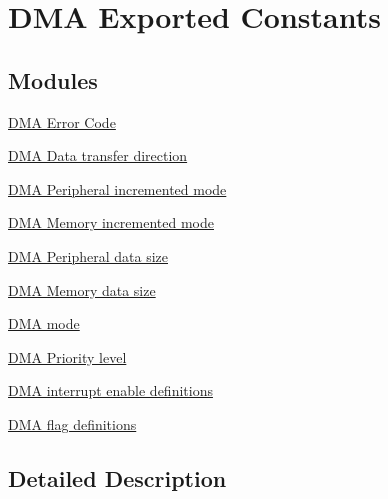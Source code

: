 \hypertarget{group___d_m_a___exported___constants}{}\section{D\+MA Exported Constants}
\label{group___d_m_a___exported___constants}
\subsection*{Modules}
\begin{DoxyCompactItemize}
\item 
\hyperlink{group___d_m_a___error___code}{D\+M\+A Error Code}
\item 
\hyperlink{group___d_m_a___data__transfer__direction}{D\+M\+A Data transfer direction}
\item 
\hyperlink{group___d_m_a___peripheral__incremented__mode}{D\+M\+A Peripheral incremented mode}
\item 
\hyperlink{group___d_m_a___memory__incremented__mode}{D\+M\+A Memory incremented mode}
\item 
\hyperlink{group___d_m_a___peripheral__data__size}{D\+M\+A Peripheral data size}
\item 
\hyperlink{group___d_m_a___memory__data__size}{D\+M\+A Memory data size}
\item 
\hyperlink{group___d_m_a__mode}{D\+M\+A mode}
\item 
\hyperlink{group___d_m_a___priority__level}{D\+M\+A Priority level}
\item 
\hyperlink{group___d_m_a__interrupt__enable__definitions}{D\+M\+A interrupt enable definitions}
\item 
\hyperlink{group___d_m_a__flag__definitions}{D\+M\+A flag definitions}
\end{DoxyCompactItemize}


\subsection{Detailed Description}
